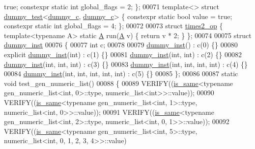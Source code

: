 \begin{DoxyCode}
{      true};  constexpr \textcolor{keyword}{static} \textcolor{keywordtype}{int} global\_flags = 2; \};
00071 \textcolor{keyword}{template}<> \textcolor{keyword}{struct }\hyperlink{structdummy__test}{dummy\_test}<\hyperlink{structdummy__c}{dummy\_c}, \hyperlink{structdummy__c}{dummy\_c}>     \{ constexpr \textcolor{keyword}{static} \textcolor{keywordtype}{bool} value = \textcolor{keyword}{
      true};  constexpr \textcolor{keyword}{static} \textcolor{keywordtype}{int} global\_flags = 4; \};
00072 
00073 \textcolor{keyword}{struct }\hyperlink{structtimes2__op}{times2\_op} \{ \textcolor{keyword}{template}<\textcolor{keyword}{typename} A> \textcolor{keyword}{static} \hyperlink{group___core___module_class_eigen_1_1_matrix}{A} run(\hyperlink{group___core___module_class_eigen_1_1_matrix}{A} v) \{ \textcolor{keywordflow}{return} v * 2; \} \};
00074 
00075 \textcolor{keyword}{struct }\hyperlink{structdummy__inst}{dummy\_inst}
00076 \{
00077   \textcolor{keywordtype}{int} c;
00078 
00079   \hyperlink{structdummy__inst}{dummy\_inst}() : c(0) \{\}
00080   \textcolor{keyword}{explicit} \hyperlink{structdummy__inst}{dummy\_inst}(\textcolor{keywordtype}{int}) : c(1) \{\}
00081   \hyperlink{structdummy__inst}{dummy\_inst}(\textcolor{keywordtype}{int}, \textcolor{keywordtype}{int}) : c(2) \{\}
00082   \hyperlink{structdummy__inst}{dummy\_inst}(\textcolor{keywordtype}{int}, \textcolor{keywordtype}{int}, \textcolor{keywordtype}{int}) : c(3) \{\}
00083   \hyperlink{structdummy__inst}{dummy\_inst}(\textcolor{keywordtype}{int}, \textcolor{keywordtype}{int}, \textcolor{keywordtype}{int}, \textcolor{keywordtype}{int}) : c(4) \{\}
00084   \hyperlink{structdummy__inst}{dummy\_inst}(\textcolor{keywordtype}{int}, \textcolor{keywordtype}{int}, \textcolor{keywordtype}{int}, \textcolor{keywordtype}{int}, \textcolor{keywordtype}{int}) : c(5) \{\}
00085 \};
00086 
00087 \textcolor{keyword}{static} \textcolor{keywordtype}{void} test\_gen\_numeric\_list()
00088 \{
00089   VERIFY((\hyperlink{struct_eigen_1_1internal_1_1is__same}{is\_same}<\textcolor{keyword}{typename} gen\_numeric\_list<int, 0>::type, numeric\_list<int>>::value));
00090   VERIFY((\hyperlink{struct_eigen_1_1internal_1_1is__same}{is\_same}<\textcolor{keyword}{typename} gen\_numeric\_list<int, 1>::type, numeric\_list<int, 0>>::value));
00091   VERIFY((\hyperlink{struct_eigen_1_1internal_1_1is__same}{is\_same}<\textcolor{keyword}{typename} gen\_numeric\_list<int, 2>::type, numeric\_list<int, 0, 1>>::value));
00092   VERIFY((\hyperlink{struct_eigen_1_1internal_1_1is__same}{is\_same}<\textcolor{keyword}{typename} gen\_numeric\_list<int, 5>::type, numeric\_list<int, 0, 1, 2, 3, 4>>::value)

\end{DoxyCode}

